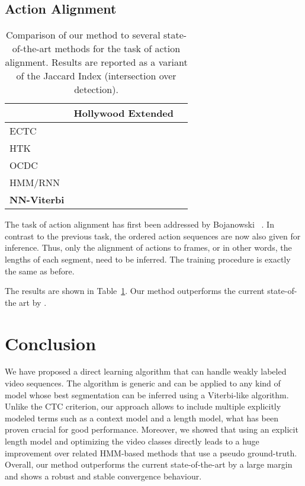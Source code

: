 \documentclass[10pt,twocolumn,letterpaper]{article}
\begin{document}
\subsection{Action Alignment}
\label{sec:actionAlignment}

\begin{table}
    \footnotesize
    \begin{tabularx}{0.48\textwidth}{Xrr}
        \toprule
                                            & \textbf{Hollywood Extended} \\
        \midrule
        ECTC \cite{huang2016connectionist}  &  \\
        HTK \cite{kuehne16end}              &  \\
        OCDC \cite{bojanowski14weakly}      &  \\
        HMM/RNN \cite{richard2017weakly}    &  \\
        \midrule
        \textbf{NN-Viterbi}              &  \\
        \bottomrule
    \end{tabularx}
    \caption{Comparison of our method to several state-of-the-art methods
             for the task of action alignment. Results are reported as a
             variant of the Jaccard Index (intersection over detection).}
    \label{tab:actionAlignment}
    \vspace{-0.3cm}
\end{table}

The task of action alignment has first been addressed by Bojanowski \etal~\cite{bojanowski14weakly}.
In contrast to the previous task, the ordered action sequences 
are now also given for inference. Thus, only the alignment of actions to frames,
or in other words, the lengths  of each segment, need to be
inferred. The training procedure is exactly the same as before.

The results are shown in Table~\ref{tab:actionAlignment}. Our method
outperforms the current state-of-the art by .


\section{Conclusion}
\label{sec:conclusion}

We have proposed a direct learning algorithm that can handle weakly labeled
video sequences. The algorithm is generic and can be applied to any kind of model
whose best segmentation can be inferred using a Viterbi-like algorithm.
Unlike the CTC criterion, our approach allows to include multiple
explicitly modeled terms such as a context model and a length model, what has
been proven crucial for good performance.
Moreover, we showed that using an explicit length model and optimizing the
video classes directly leads to a huge improvement over related HMM-based
methods that use a pseudo ground-truth.
Overall, our method outperforms the current state-of-the-art by a large margin
and shows a robust and stable convergence behaviour.
\end{document}
